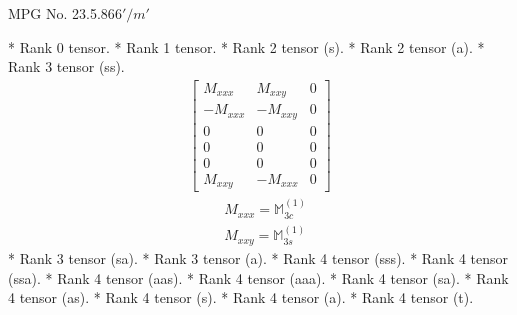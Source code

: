 \documentclass[fleqn,8pt,landscape]{jsarticle}
\begin{document}
\setcounter{MaxMatrixCols}{32}

\renewcommand{\tablename}{Table~}
\renewcommand{\figurename}{Figure~}
\begin{center}
\LARGE
MPG No. 23.5.86\quad$6'/m'$
\end{center}
* Rank 0 tensor.
* Rank 1 tensor.
* Rank 2 tensor (s).
* Rank 2 tensor (a).
* Rank 3 tensor (ss).
\begin{align*}
\begin{bmatrix} M_{xxx} & M_{xxy} & 0 \\ - M_{xxx} & - M_{xxy} & 0 \\ 0 & 0 & 0 \\ 0 & 0 & 0 \\ 0 & 0 & 0 \\ M_{xxy} & - M_{xxx} & 0 \end{bmatrix}
\end{align*}
\begin{align*}
& M_{xxx} = \mathbb{M}_{3c}^{(1)} \\
& M_{xxy} = \mathbb{M}_{3s}^{(1)}
\end{align*}
* Rank 3 tensor (sa).
* Rank 3 tensor (a).
* Rank 4 tensor (sss).
* Rank 4 tensor (ssa).
* Rank 4 tensor (aas).
* Rank 4 tensor (aaa).
* Rank 4 tensor (sa).
* Rank 4 tensor (as).
* Rank 4 tensor (s).
* Rank 4 tensor (a).
* Rank 4 tensor (t).
\end{document}
